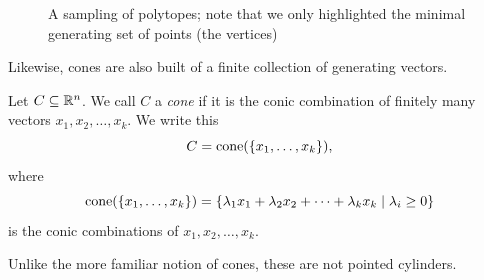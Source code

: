 \documentclass[12pt,oneside]{../../sfsuthesis}
\begin{document}
\begin{figure}[H]
\begin{subfigure}[t]{0.4\textwidth}

    \end{subfigure}
    \caption{A sampling of polytopes; note that we only highlighted the minimal generating set of points (the vertices)}
\end{figure}

Likewise, cones are also built of a finite collection of generating vectors.
\begin{definition}[Cone]\th\label{def:cone}
    Let \( C \subseteq \mathbb{R}^n \).
    We call \( C \) a \emph{cone} if it is the conic combination of finitely many vectors \( x_1, x_2, \dots, x_k \).
    We write this
    \[
        C = \mathrm{cone}(\{x_1, \dots, x_k\}),
    \]
    where
    \[
        \mathrm{cone}(\{x_1, \dots, x_k\}) = \left\{ \lambda_1 x_1 + \lambda_2 x_2 + \cdots + \lambda_k x_k \; \middle| \; \lambda_i \geq 0 \right\}
    \]
    is the conic combinations of \( x_1, x_2, \dots, x_k \).

\end{definition}
Unlike the more familiar notion of cones, these are not pointed cylinders.
\end{document}
